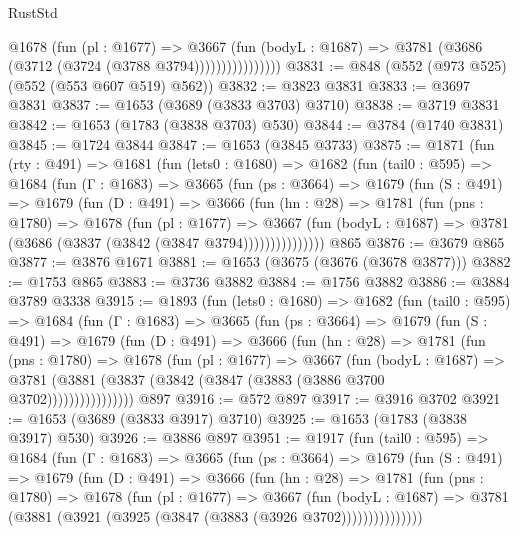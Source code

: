\begin{lexlean}{RustStd}
\begin{coremodule}
{\begin{coremodule}
{{{{{{{{{{{{{{{{                      @1678
                        (fun (pl : @1677) =>
                        @3667
                          (fun (bodyL : @1687) =>
                          @3781 (@3686 (@3712 (@3724 (@3788 @3794))))))))))))))))
@3831 := @848 (@552 (@973 @525) (@552 (@553 @607 @519) @562))
@3832 := @3823 @3831
@3833 := @3697 @3831
@3837 := @1653 (@3689 (@3833 @3703) @3710)
@3838 := @3719 @3831
@3842 := @1653 (@1783 (@3838 @3703) @530)
@3844 := @3784 (@1740 @3831)
@3845 := @1724 @3844
@3847 := @1653 (@3845 @3733)
@3875 := @1871
    (fun (rty : @491) =>
    @1681
      (fun (lets0 : @1680) =>
      @1682
        (fun (tail0 : @595) =>
        @1684
          (fun (Γ : @1683) =>
          @3665
            (fun (ps : @3664) =>
            @1679
              (fun (S : @491) =>
              @1679
                (fun (D : @491) =>
                @3666
                  (fun (hn : @28) =>
                  @1781
                    (fun (pns : @1780) =>
                    @1678
                      (fun (pl : @1677) =>
                      @3667
                        (fun (bodyL : @1687) =>
                        @3781 (@3686 (@3837 (@3842 (@3847 @3794)))))))))))))))
    @865
@3876 := @3679 @865
@3877 := @3876 @1671
@3881 := @1653 (@3675 (@3676 (@3678 @3877)))
@3882 := @1753 @865
@3883 := @3736 @3882
@3884 := @1756 @3882
@3886 := @3884 @3789 @3338
@3915 := @1893
    (fun (lets0 : @1680) =>
    @1682
      (fun (tail0 : @595) =>
      @1684
        (fun (Γ : @1683) =>
        @3665
          (fun (ps : @3664) =>
          @1679
            (fun (S : @491) =>
            @1679
              (fun (D : @491) =>
              @3666
                (fun (hn : @28) =>
                @1781
                  (fun (pns : @1780) =>
                  @1678
                    (fun (pl : @1677) =>
                    @3667
                      (fun (bodyL : @1687) =>
                      @3781 (@3881 (@3837 (@3842 (@3847 (@3883 (@3886 @3700 @3702))))))))))))))))
    @897
@3916 := @572 @897
@3917 := @3916 @3702
@3921 := @1653 (@3689 (@3833 @3917) @3710)
@3925 := @1653 (@1783 (@3838 @3917) @530)
@3926 := @3886 @897
@3951 := @1917
    (fun (tail0 : @595) =>
    @1684
      (fun (Γ : @1683) =>
      @3665
        (fun (ps : @3664) =>
        @1679
          (fun (S : @491) =>
          @1679
            (fun (D : @491) =>
            @3666
              (fun (hn : @28) =>
              @1781
                (fun (pns : @1780) =>
                @1678
                  (fun (pl : @1677) =>
                  @3667
                    (fun (bodyL : @1687) =>
                    @3781 (@3881 (@3921 (@3925 (@3847 (@3883 (@3926 @3702)))))))))))))))
}}}}}}}}}}}}}}}}
\end{coremodule}}
\end{coremodule}
\end{lexlean}
